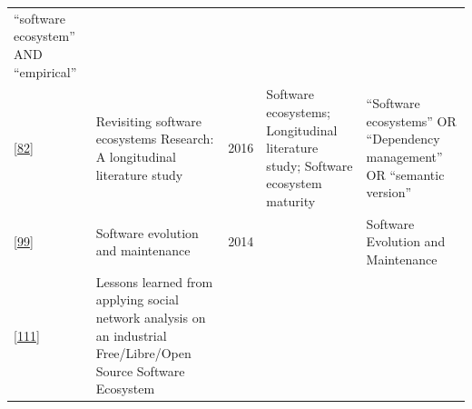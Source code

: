 \documentclass[]{book}
\begin{document}
\begin{longtable}[]{@{}lllll@{}}
\begin{minipage}[t]{0.13\columnwidth}
``software ecosystem'' AND ``empirical''\strut
\end{minipage}\tabularnewline
\begin{minipage}[t]{0.05\columnwidth}\raggedright\strut
{[}\protect\hyperlink{ref-Manikas2016}{82}{]}\strut
\end{minipage} & \begin{minipage}[t]{0.31\columnwidth}\raggedright\strut
Revisiting software ecosystems Research: A longitudinal literature
study\strut
\end{minipage} & \begin{minipage}[t]{0.02\columnwidth}\raggedright\strut
2016\strut
\end{minipage} & \begin{minipage}[t]{0.34\columnwidth}\raggedright\strut
Software ecosystems; Longitudinal literature study; Software ecosystem
maturity\strut
\end{minipage} & \begin{minipage}[t]{0.13\columnwidth}\raggedright\strut
``Software ecosystems'' OR ``Dependency management'' OR ``semantic
version''\strut
\end{minipage}\tabularnewline
\begin{minipage}[t]{0.05\columnwidth}\raggedright\strut
{[}\protect\hyperlink{ref-Rajlich2014}{99}{]}\strut
\end{minipage} & \begin{minipage}[t]{0.31\columnwidth}\raggedright\strut
Software evolution and maintenance\strut
\end{minipage} & \begin{minipage}[t]{0.02\columnwidth}\raggedright\strut
2014\strut
\end{minipage} & \begin{minipage}[t]{0.34\columnwidth}\raggedright\strut
\strut
\end{minipage} & \begin{minipage}[t]{0.13\columnwidth}\raggedright\strut
Software Evolution and Maintenance\strut
\end{minipage}\tabularnewline
\begin{minipage}[t]{0.05\columnwidth}\raggedright\strut
{[}\protect\hyperlink{ref-Teixeira2015}{111}{]}\strut
\end{minipage} & \begin{minipage}[t]{0.31\columnwidth}\raggedright\strut
Lessons learned from applying social network analysis on an industrial
Free/Libre/Open Source Software Ecosystem\strut
\end{minipage} & \begin{minipage}[t]{0.02\columnwidth}\raggedright\strut

\end{minipage}
\end{longtable}
\end{document}
